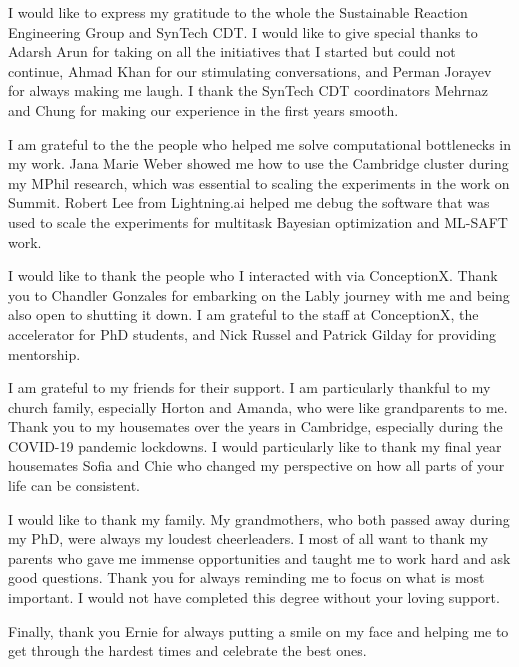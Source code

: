I would like to express my gratitude to the whole the Sustainable Reaction Engineering Group and SynTech CDT. I would like to give special thanks to Adarsh Arun for taking on all the initiatives that I started but could not continue, Ahmad Khan for our stimulating conversations, and Perman Jorayev for always making me laugh. I thank the SynTech CDT coordinators Mehrnaz and Chung for making our experience in the first years smooth.

I am grateful to the the people who helped me solve computational bottlenecks in my work. Jana Marie Weber showed me how to use the Cambridge cluster during my MPhil research, which was essential to scaling the experiments in the work on Summit. Robert Lee from Lightning.ai helped me debug the software that was used to scale the experiments for multitask Bayesian optimization and ML-SAFT work. 

I would like to thank the people who I interacted with via ConceptionX. Thank you to  Chandler Gonzales  for embarking on the Lably journey with me and being also open to shutting it down.  I am grateful to the staff at ConceptionX, the accelerator for PhD students, and Nick Russel and Patrick Gilday for providing mentorship.  

I am grateful to my friends for their support. I am particularly thankful to my church family, especially Horton and Amanda, who were like grandparents to me. Thank you to my housemates over the years in Cambridge, especially during the COVID-19 pandemic lockdowns. I would particularly like to thank my final year housemates Sofia and Chie who changed my perspective on how all parts of your life can be consistent. 

I would like to thank my family. My grandmothers, who both passed away during my PhD, were always my loudest cheerleaders. I most of all want to thank my parents who gave me immense opportunities and taught me to work hard and ask good questions. Thank you for always reminding me to focus on what is most important. I would not have completed this degree without your loving support.

Finally, thank you Ernie for always putting a smile on my face and helping me to get through the hardest times and celebrate the best ones.





